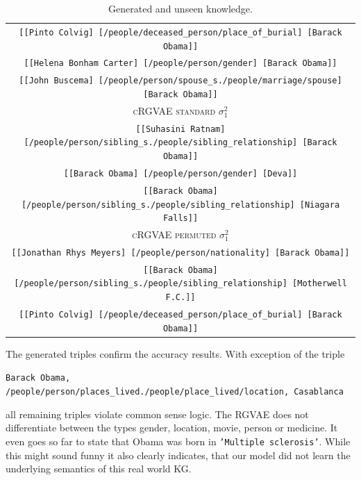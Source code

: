 \begin{table}[H]
\begin{tabular}{|c|}
  \texttt{[[Pinto Colvig]	[/people/deceased\_person/place\_of\_burial]	[Barack Obama]]}\\
  \texttt{[[Helena Bonham Carter]	[/people/person/gender]	[Barack Obama]]}\\
  \texttt{[[John Buscema]	[/people/person/spouse\_s./people/marriage/spouse]	[Barack Obama]]}\\ \hline
  \rowcolor[HTML]{EFEFEF} 
  \textsc{cRGVAE standard} $\sigma_1^2$\\ \hline
  \texttt{[[Suhasini Ratnam]	[/people/person/sibling\_s./people/sibling\_relationship]	[Barack Obama]]}\\
  \texttt{[[Barack Obama]	[/people/person/gender]	[Deva]]}\\
  \texttt{[[Barack Obama]	[/people/person/sibling\_s./people/sibling\_relationship]	[Niagara Falls]]}\\ \hline
  \rowcolor[HTML]{EFEFEF} 
  \textsc{cRGVAE permuted} $\sigma_1^2$\\ \hline
  \texttt{[[Jonathan Rhys Meyers]	[/people/person/nationality]	[Barack Obama]]}\\
  \texttt{[[Barack Obama]	[/people/person/sibling\_s./people/sibling\_relationship]	[Motherwell F.C.]]}\\
  \texttt{[[Pinto Colvig]	[/people/deceased\_person/place\_of\_burial]	[Barack Obama]]}\\ \hline
  \end{tabular}
\caption{Generated and unseen knowledge.}
\label{tab5:genTriples}
\end{table}


The generated triples confirm the accuracy results. With exception of the triple 
\begin{center}
  \texttt{Barack Obama, /people/person/places\_lived./people/place\_lived/location, Casablanca} 
\end{center}

all remaining triples violate common sense logic. The RGVAE does not differentiate between the types gender, location, movie, person or medicine. It even goes so far to state that Obama was born in \texttt{'Multiple sclerosis'}. While this might sound funny it also clearly indicates, that our model did not learn the underlying semantics of this real world KG.

